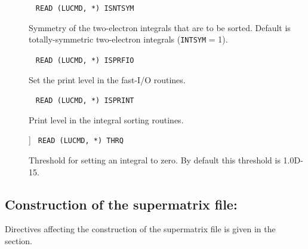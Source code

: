 \begin{description}
\item[]\verb| |\newline
\verb|READ (LUCMD, *) ISNTSYM|

Symmetry of the two-electron integrals that are to be sorted.
Default is totally-symmetric two-electron integrals (\verb|INTSYM|
= 1).

\item[]\verb| |\newline
\verb|READ (LUCMD, *) ISPRFIO|

Set the print level in the fast-I/O routines.

\item[]\verb| |\newline
\verb|READ (LUCMD, *) ISPRINT|

Print level in the integral sorting routines.

\item[]]\verb| |\newline
\verb|READ (LUCMD, *) THRQ|

Threshold for setting an integral to zero. By default this threshold
is 1.0D-15.

\end{description}

\subsection{Construction of the supermatrix file:
}\label{sec:supint}

Directives affecting the construction of the
supermatrix file is given
in the  section.

